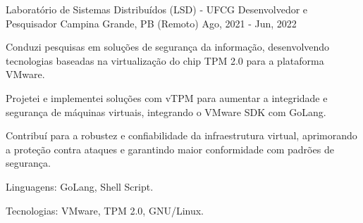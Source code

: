 \begin{cventries}
  \cventry
  {Laboratório de Sistemas Distribuídos (LSD) - UFCG} %
  {Desenvolvedor e Pesquisador} %
  {Campina Grande, PB (Remoto)} %
  {Ago, 2021 - Jun, 2022} %
  {
    \begin{cvitems} %
      \item {Conduzi pesquisas em soluções de segurança da informação, desenvolvendo tecnologias baseadas na virtualização do chip TPM 2.0 para a plataforma VMware.}
      \item {Projetei e implementei soluções com vTPM para aumentar a integridade e segurança de máquinas virtuais, integrando o VMware SDK com GoLang.}
      \item {Contribuí para a robustez e confiabilidade da infraestrutura virtual, aprimorando a proteção contra ataques e garantindo maior conformidade com padrões de segurança.}
      \item {Linguagens: GoLang, Shell Script.}
      \item {Tecnologias: VMware, TPM 2.0, GNU/Linux.}
    \end{cvitems}
  }



\end{cventries}
